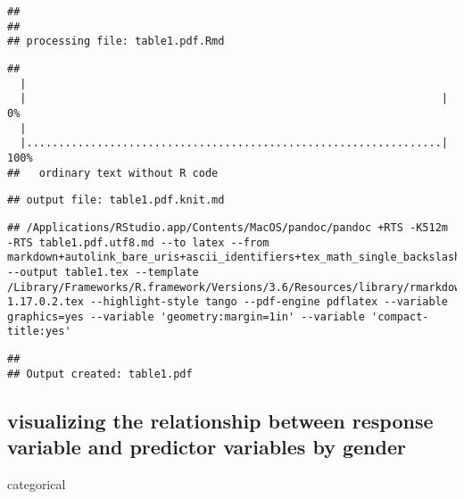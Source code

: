 \documentclass[]{article}
\begin{document}
\begin{verbatim}
## 
## 
## processing file: table1.pdf.Rmd
\end{verbatim}

\begin{verbatim}
## 
  |                                                                       
  |                                                                 |   0%
  |                                                                       
  |.................................................................| 100%
##   ordinary text without R code
\end{verbatim}

\begin{verbatim}
## output file: table1.pdf.knit.md
\end{verbatim}

\begin{verbatim}
## /Applications/RStudio.app/Contents/MacOS/pandoc/pandoc +RTS -K512m -RTS table1.pdf.utf8.md --to latex --from markdown+autolink_bare_uris+ascii_identifiers+tex_math_single_backslash --output table1.tex --template /Library/Frameworks/R.framework/Versions/3.6/Resources/library/rmarkdown/rmd/latex/default-1.17.0.2.tex --highlight-style tango --pdf-engine pdflatex --variable graphics=yes --variable 'geometry:margin=1in' --variable 'compact-title:yes'
\end{verbatim}

\begin{verbatim}
## 
## Output created: table1.pdf
\end{verbatim}

\hypertarget{visualizing-the-relationship-between-response-variable-and-predictor-variables-by-gender}{%
\subsection{visualizing the relationship between response variable and
predictor variables by
gender}\label{visualizing-the-relationship-between-response-variable-and-predictor-variables-by-gender}}

categorical
\end{document}
